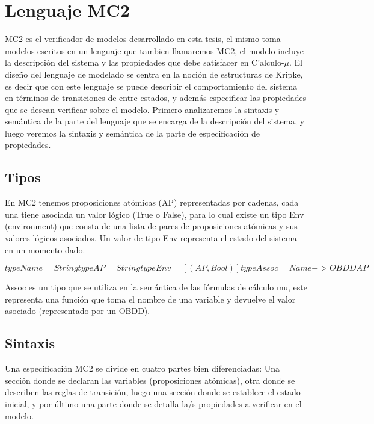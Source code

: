 \chapter{Lenguaje MC2}

MC2 es el verificador de modelos desarrollado en esta tesis, el mismo toma modelos escritos en un lenguaje que tambien llamaremos MC2, el modelo incluye la descripción del sistema y las propiedades que debe satisfacer en C'alculo-$\mu$. El diseño del lenguaje de modelado se centra en la noción de estructuras de Kripke, es decir que con este lenguaje se puede describir el comportamiento del sistema en términos de transiciones de entre estados, y además especificar las propiedades que se desean verificar sobre el modelo. Primero analizaremos la sintaxis y semántica de la parte del lenguaje que se encarga de la descripción del sistema, y luego veremos la sintaxis y semántica de la parte de especificación de propiedades.

\section{Tipos}

En MC2 tenemos proposiciones atómicas (AP) representadas por cadenas, cada una tiene asociada un valor lógico (True o False), para lo cual existe un tipo Env (environment) que consta de una lista de pares de proposiciones atómicas y sus valores lógicos asociados. Un valor de tipo Env representa el estado del sistema en un momento dado.

$type Name = String
type AP = String
type Env = [(AP,Bool)]
type Assoc = Name -> OBDD AP$

Assoc es un tipo que se utiliza en la semántica de las fórmulas de cálculo mu, este representa una función que toma el nombre de una variable y devuelve el valor asociado (representado por un OBDD).

\section{Sintaxis}

Una especificación MC2 se divide en cuatro partes bien diferenciadas: Una sección donde se declaran las variables (proposiciones atómicas), otra donde se describen las reglas de transición, luego una sección donde se establece el estado inicial, y por último una parte donde se detalla la/s propiedades a verificar en el modelo.
